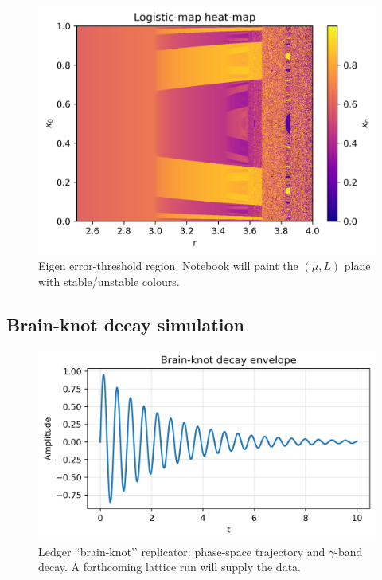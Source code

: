 \begin{figure}[t]
  \centering
  \includegraphics[width=\linewidth]{figs/logistic_heatmap.png}
  \caption{Eigen error-threshold region.  Notebook will paint the $(\mu,L)$ plane with stable/unstable colours.}
  \label{fig:heatmap}
\end{figure}

\subsection{Brain-knot decay simulation}

\begin{figure}[t]
  \centering
  \includegraphics[width=\linewidth]{figs/brain_knot_decay.png}
  \caption{Ledger “brain-knot’’ replicator: phase-space trajectory and
           $\gamma$-band decay.  A forthcoming lattice run will supply the data.}
  \label{fig:brain-knot}
\end{figure}

